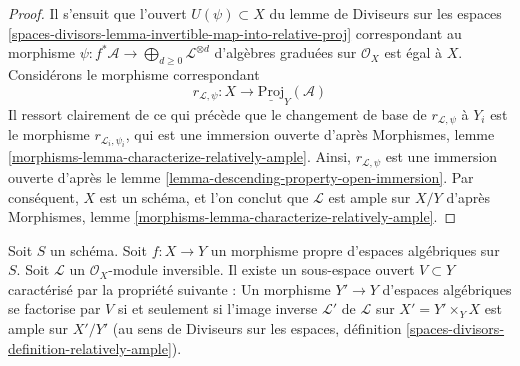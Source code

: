 \begin{proof}
Il s'ensuit que l'ouvert $U(\psi) \subset X$ du
lemme de Diviseurs sur les espaces
\ref{spaces-divisors-lemma-invertible-map-into-relative-proj}
correspondant au morphisme
$\psi : f^*\mathcal{A} \to \bigoplus_{d \geq 0} \mathcal{L}^{\otimes d}$
d'algèbres graduées sur $\mathcal{O}_X$
est égal à $X$. Considérons le morphisme correspondant
$$
r_{\mathcal{L}, \psi} : X \longrightarrow \underline{\text{Proj}}_Y(\mathcal{A})
$$
Il ressort clairement de ce qui précède que le changement de base de
$r_{\mathcal{L}, \psi}$ à $Y_i$ est le morphisme
$r_{\mathcal{L}_i, \psi_i}$, qui est une immersion ouverte d'après
Morphismes, lemme \ref{morphisms-lemma-characterize-relatively-ample}.
Ainsi, $r_{\mathcal{L}, \psi}$ est une immersion ouverte
d'après le lemme \ref{lemma-descending-property-open-immersion}.
Par conséquent, $X$ est un schéma,
et l'on conclut que $\mathcal{L}$ est ample sur $X/Y$ d'après
Morphismes, lemme \ref{morphisms-lemma-characterize-relatively-ample}.
\end{proof}

\begin{lemma}
\label{lemma-ample-in-neighbourhood}
Soit $S$ un schéma.
Soit $f : X \to Y$ un morphisme propre d'espaces algébriques sur $S$.
Soit $\mathcal{L}$ un $\mathcal{O}_X$-module inversible.
Il existe un sous-espace ouvert $V \subset Y$ caractérisé par
la propriété suivante :
Un morphisme $Y' \to Y$ d'espaces algébriques se factorise
par $V$ si et seulement si l'image inverse $\mathcal{L}'$
de $\mathcal{L}$ sur $X' = Y' \times_Y X$ est ample sur $X'/Y'$
(au sens de Diviseurs sur les espaces, définition
\ref{spaces-divisors-definition-relatively-ample}).
\end{lemma}

